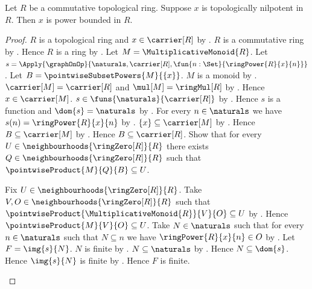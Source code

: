 \begin{theorem}\label{topologically_nilpotent_is_power_bounded}
    Let $R$ be a commutative topological ring.
    Suppose $x$ is topologically nilpotent in $R$.
    Then $x$ is power bounded in $R$.
\end{theorem}
\begin{proof}
    $R$ is a topological ring and $x\in\carrier[R]$ by
        .
    $R$ is a commutative ring by
        .
    Hence $R$ is a ring by .
    Let $M=\MultiplicativeMonoid{R}$.
    Let $s=\Apply{\graphOnOp}{
        \naturals,\carrier[R],
        \fun{n:\Set}{\ringPower{R}{x}{n}}}$.
    Let $B=\pointwiseSubsetPowers{M}{\{x\}}$.
    $M$ is a monoid by .
    $\carrier[M]=\carrier[R]$ and $\mul[M]=\ringMul[R]$ by
        .
    Hence $x\in\carrier[M]$.
    $s\in\funs{\naturals}{\carrier[R]}$ by
        .
    Hence $s$ is a function and $\dom{s}=\naturals$ by
        .
    For every $n\in\naturals$ we have
        $s(n)=\ringPower{R}{x}{n}$ by
        .
    $\{x\}\subseteq\carrier[M]$ by .
    Hence $B\subseteq\carrier[M]$ by
        .
    Hence $B\subseteq\carrier[R]$.
    Show that for every $U\in\neighbourhoods{\ringZero[R]}{R}$ there
        exists $Q\in\neighbourhoods{\ringZero[R]}{R}$ such that
        $\pointwiseProduct{M}{Q}{B}\subseteq U$.
    \begin{subproof}
        Fix $U\in\neighbourhoods{\ringZero[R]}{R}$.
        Take $V,O\in\neighbourhoods{\ringZero[R]}{R}$ such that
            $\pointwiseProduct{\MultiplicativeMonoid{R}}{V}{O}
                \subseteq U$ by
            .
        Hence $\pointwiseProduct{M}{V}{O}\subseteq U$.
        Take $N\in\naturals$ such that for every $n\in\naturals$ such
            that $N\subseteq n$ we have $\ringPower{R}{x}{n}\in O$ by
            .
        Let $F=\img{s}{N}$.
        $N$ is finite by .
        $N\subseteq\naturals$ by
            .
        Hence $N\subseteq\dom{s}$.
        Hence $\img{s}{N}$ is finite by .
        Hence $F$ is finite.

\end{subproof}
\end{proof}
